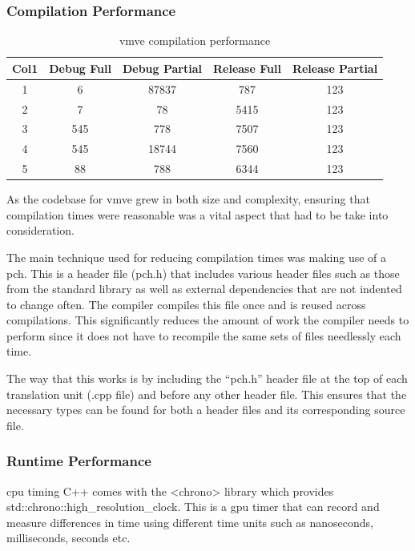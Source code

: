 \documentclass[11pt]{article}
\begin{document}
\subsubsection{Compilation Performance}

\begin{table}[h!]
\centering
\begin{tabular}{||c c c c c ||} 
  \hline
  Col1 & Debug Full & Debug Partial  & Release Full & Release Partial \\ [0.5ex] 
  \hline\hline
  1 & 6 & 87837 & 787 & 123 \\ 
  2 & 7 & 78 & 5415 & 123 \\
  3 & 545 & 778 & 7507 & 123 \\
  4 & 545 & 18744 & 7560 & 123  \\
  5 & 88 & 788 & 6344 & 123 \\ [1ex] 
  \hline
\end{tabular}
\caption{\gls{vmve} compilation performance}
\label{fig:compilation_performance}
\end{table}

As the codebase for \gls{vmve} grew in both size and complexity, ensuring that
compilation times were reasonable was a vital aspect that had to be take into
consideration.

The main technique used for reducing compilation times was making use of a
\gls{pch}. This is a header file (pch.h) that includes various header files such
as those from the standard library as well as external dependencies that are not
indented to change often. The compiler compiles this file once and is reused
across compilations. This significantly reduces the amount of work the compiler
needs to perform since it does not have to recompile the same sets of files
needlessly each time.

The way that this works is by including the ``pch.h'' header file at the top of
each translation unit (.cpp file) and before any other header file. This ensures
that the necessary types can be found for both a header files and its
corresponding source file.

\subsubsection{Runtime Performance}

\gls{cpu} timing C++ comes with the <chrono> library which provides
std::chrono::high\_resolution\_clock. This is a \gls{gpu} timer that
can record and measure differences in time using different
time units such as nanoseconds, milliseconds, seconds etc.
\end{document}
